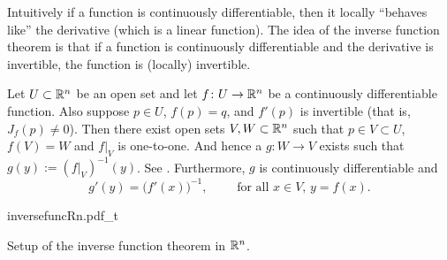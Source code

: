 Intuitively if a function is continuously differentiable, then it
locally ``behaves like'' the derivative (which is a linear function).
The idea of the inverse function theorem is that if a function is
continuously differentiable and the derivative is invertible, the function is
(locally) invertible.


\begin{thm}
\label{thm:inverse}
Let $U \subset {\mathbb{R}}^n$ be an open set and let
$f \colon U \to {\mathbb{R}}^n$ be a continuously differentiable function.
Also suppose $p \in U$, $f(p) = q$, and $f'(p)$ is invertible
(that is, $J_f(p) \not=0$).
Then there exist open sets $V, W \subset {\mathbb{R}}^n$ such that
$p \in V \subset U$, $f(V) = W$ and $f|_V$ is one-to-one.  
And hence a $g \colon W \to V$ exists such that
$g(y) := (f|_V)^{-1}(y)$.
See .
Furthermore, $g$ is continuously differentiable
and 
\begin{equation*}
g'(y) = {\bigl(f'(x)\bigr)}^{-1}, \qquad \text{ for all $x \in V$, $y = f(x)$.}
\end{equation*}
\end{thm}

\begin{myfigureht}
{inversefuncRn.pdf_t}
\caption{Setup of the inverse function theorem in ${\mathbb{R}}^n$.\label{fig:inversefuncRn}}
\end{myfigureht}

